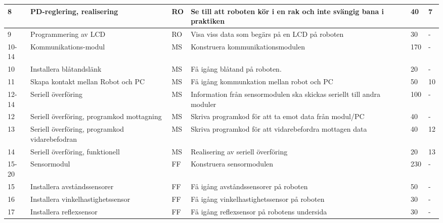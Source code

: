 \documentclass[11pt]{article}
\begin{document}
\begin{flushleft}
\begin{longtable}{|l|p{.20\linewidth}|l|p{.30\linewidth}|p{.10\linewidth}|p{.10\linewidth}|}
8 &
PD-reglering, realisering &
RO &
Se till att roboten kör i en rak och inte svängig bana i praktiken &
40 &
7 \\ \hline
 
 
9 &
Programmering av LCD &
RO &
Visa viss data som begärs på en LCD på roboten &
30 &
- \\ \hline
 
10-14 &
Kommunikations-modul &
MS &
Konstruera kommunikationsmodulen &
170 &
- \\ \hline

10 &
Installera blåtandslänk &
MS &
Få igång blåtand på roboten. &
20 &
- \\ \hline
 
11 &
Skapa kontakt mellan Robot och PC &
MS &
Få igång kommunkation mellan robot och PC &
50 &
10 \\ \hline
 

12-14 &
Seriell överföring&
MS &
Information från sensormodulen ska skickas seriellt till andra moduler&
100 &
- \\ \hline

12 &
Seriell överföring, programkod mottagning&
MS &
Skriva programkod för att ta emot data från modul/PC&
40 &
- \\ \hline

13 &
Seriell överföring, programkod vidarebefodran&
MS &
Skriva programkod för att vidarebefordra mottagen data&
40 &
12 \\ \hline
 
14 &
Seriell överföring, funktionell&
MS &
Realisering av seriell överföring&
20 &
13 \\ \hline

 
15-20 &
Sensormodul &
FF &
Konstruera sensormodulen &
230 &
- \\ \hline
 
15 &
Installera avståndssensorer&
FF &
Få igång avståndssensorer på roboten&
50 &
- \\ \hline

16 &
Installera vinkelhastighetssensor&
FF &
Få igång vinkelhastighetssensor på roboten&
30 &
- \\ \hline

17 &
Installera reflexsensor&
FF &
Få igång reflexsensor på robotens undersida&
30 &
- \\ \hline


\end{longtable}
\end{flushleft}
\end{document}
